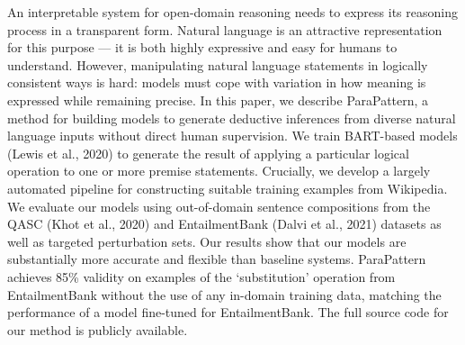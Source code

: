 An interpretable system for open-domain reasoning needs to express its reasoning process in a transparent form. Natural language is an attractive representation for this purpose — it is both highly expressive and easy for humans to understand. However, manipulating natural language statements in logically consistent ways is hard: models must cope with variation in how meaning is expressed while remaining precise. In this paper, we describe ParaPattern, a method for building models to generate deductive inferences from diverse natural language inputs without direct human supervision. We train BART-based models (Lewis et al., 2020) to generate the result of applying a particular logical operation to one or more premise statements. Crucially, we develop a largely automated pipeline for constructing suitable training examples from Wikipedia. We evaluate our models using out-of-domain sentence compositions from the QASC (Khot et al., 2020) and EntailmentBank (Dalvi et al., 2021) datasets as well as targeted perturbation sets. Our results show that our models are substantially more accurate and flexible than baseline systems. ParaPattern achieves 85\% validity on examples of the ‘substitution' operation from EntailmentBank without the use of any in-domain training data, matching the performance of a model fine-tuned for EntailmentBank. The full source code for our method is publicly available.

